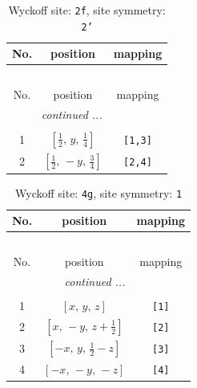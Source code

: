 \documentclass[fleqn,8pt]{jsarticle}
\begin{document}
\renewcommand{\arraystretch}{1.2}
\begin{longtable}{ccc}
\caption{Wyckoff site: {\tt 2f}, site symmetry: {\tt 2'}}
 \\
 \hline \hline
No. & position & mapping \\ \hline \endfirsthead

\multicolumn{2}{l}{\tablename\ \thetable{}} \\
 \hline \hline
No. & position & mapping \\ \hline \endhead

 \hline \hline
\multicolumn{2}{r}{\footnotesize\it continued ...} \\ \endfoot

 \hline \hline
\multicolumn{2}{r}{} \\ \endlastfoot

1 & $\left[ \frac{1}{2},\, y,\, \frac{1}{4} \right]$ & {\tt [1,3]} \\ \hline
2 & $\left[ \frac{1}{2},\, - y,\, \frac{3}{4} \right]$ & {\tt [2,4]} \\
\end{longtable}
\renewcommand{\arraystretch}{1.2}
\begin{longtable}{ccc}
\caption{Wyckoff site: {\tt 4g}, site symmetry: {\tt 1}}
 \\
 \hline \hline
No. & position & mapping \\ \hline \endfirsthead

\multicolumn{2}{l}{\tablename\ \thetable{}} \\
 \hline \hline
No. & position & mapping \\ \hline \endhead

 \hline \hline
\multicolumn{2}{r}{\footnotesize\it continued ...} \\ \endfoot

 \hline \hline
\multicolumn{2}{r}{} \\ \endlastfoot

1 & $\left[ x,\, y,\, z \right]$ & {\tt [1]} \\ \hline
2 & $\left[ x,\, - y,\, z + \frac{1}{2} \right]$ & {\tt [2]} \\ \hline
3 & $\left[ - x,\, y,\, \frac{1}{2} - z \right]$ & {\tt [3]} \\ \hline
4 & $\left[ - x,\, - y,\, - z \right]$ & {\tt [4]} \\
\end{longtable}
\end{document}
